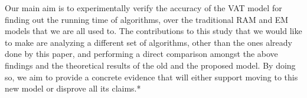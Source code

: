 Our main aim is to experimentally verify the accuracy of the VAT model for finding out the running time of algorithms, over the traditional RAM and EM models that we are all used to. The contributions to this study that we would like to make are analyzing a different set of algorithms, other than the ones already done by this paper, and performing a direct comparison amongst the above findings and the theoretical results of the old and the proposed model. By doing so, we aim to provide a concrete evidence that will either support moving to this new model or disprove all its claims.*
